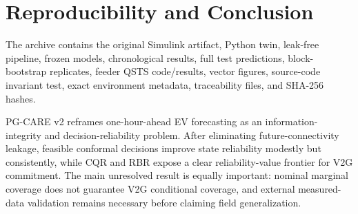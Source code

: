 \documentclass[journal]{IEEEtran}
\begin{document}
\section{Reproducibility and Conclusion}
The archive contains the original Simulink artifact, Python twin, leak-free pipeline, frozen models, chronological results, full test predictions, block-bootstrap replicates, feeder QSTS code/results, vector figures, source-code invariant test, exact environment metadata, traceability files, and SHA-256 hashes.

PG-CARE v2 reframes one-hour-ahead EV forecasting as an information-integrity and decision-reliability problem. After eliminating future-connectivity leakage, feasible conformal decisions improve state reliability modestly but consistently, while CQR and RBR expose a clear reliability-value frontier for V2G commitment. The main unresolved result is equally important: nominal marginal coverage does not guarantee V2G conditional coverage, and external measured-data validation remains necessary before claiming field generalization.
\end{document}
